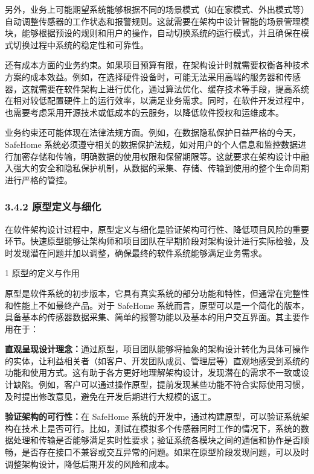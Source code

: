 另外，业务上可能期望系统能够根据不同的场景模式（如在家模式、外出模式等）自动调整传感器的工作状态和报警规则。这就需要在架构中设计智能的场景管理模块，能够根据预设的规则和用户的操作，自动切换系统的运行模式，并且确保在模式切换过程中系统的稳定性和可靠性。

还有成本方面的业务约束。如果项目预算有限，在架构设计时就需要权衡各种技术方案的成本效益。例如，在选择硬件设备时，可能无法采用高端的服务器和传感器，这就需要在软件架构上进行优化，通过算法优化、缓存技术等手段，提高系统在相对较低配置硬件上的运行效率，以满足业务需求。同时，在软件开发过程中，也需要考虑采用开源技术或低成本的云服务，以降低软件授权和运维成本。

业务约束还可能体现在法律法规方面。例如，在数据隐私保护日益严格的今天，SafeHome 系统必须遵守相关的数据保护法规，如对用户的个人信息和监控数据进行加密存储和传输，明确数据的使用权限和保留期限等。这就要求在架构设计中融入强大的安全和隐私保护机制，从数据的采集、存储、传输到使用的整个生命周期进行严格的管控。

\subsubsection{3.4.2 原型定义与细化}\label{ux539fux578bux5b9aux4e49ux4e0eux7ec6ux5316}

在软件架构设计过程中，原型定义与细化是验证架构可行性、降低项目风险的重要环节。快速原型能够让架构师和项目团队在早期阶段对架构设计进行实际检验，及时发现潜在问题并加以调整，确保最终的软件系统能够满足业务需求。

1 原型的定义与作用

原型是软件系统的初步版本，它具有真实系统的部分功能和特性，但通常在完整性和性能上不如最终产品。对于 SafeHome 系统而言，原型可以是一个简化的版本，具备基本的传感器数据采集、简单的报警功能以及基本的用户交互界面。其主要作用在于：

\textbf{直观呈现设计理念：}通过原型，项目团队能够将抽象的架构设计转化为具体可操作的实体，让利益相关者（如客户、开发团队成员、管理层等）直观地感受到系统的功能和使用方式。这有助于各方更好地理解架构设计，发现潜在的需求不一致或设计缺陷。例如，客户可以通过操作原型，提前发现某些功能不符合实际使用习惯，及时提出修改意见，避免在开发后期进行大规模的返工。

\textbf{验证架构的可行性：}在 SafeHome 系统的开发中，通过构建原型，可以验证系统架构在技术上是否可行。比如，测试在模拟多个传感器同时工作的情况下，系统的数据处理和传输是否能够满足实时性要求；验证系统各模块之间的通信和协作是否顺畅，是否存在接口不兼容或交互异常的问题。如果在原型阶段发现问题，可以及时调整架构设计，降低后期开发的风险和成本。

